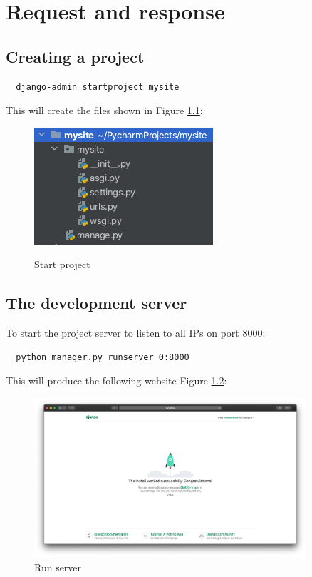 
\chapter{Request and response}

\section{Creating a project}

\lstset{language=Sh}
\begin{lstlisting}
  django-admin startproject mysite
\end{lstlisting}

This will create the files shown in Figure \ref{fig:startproject}:
\begin{figure}[!ht]
  \centering
  \includegraphics[width=\textwidth]{startproject.png}
  \label{fig:startproject}
  \caption{Start project}
\end{figure}


\section{The development server}
To start the project server to listen to all IPs on port 8000:
\begin{lstlisting}
  python manager.py runserver 0:8000
\end{lstlisting}

This will produce the following website Figure \ref{fig:runserver}:
\begin{figure}[!ht]
  \centering
  \includegraphics[width=0.9\textwidth]{runserver.png}
  \caption{Run server}
  \label{fig:runserver}
\end{figure}

